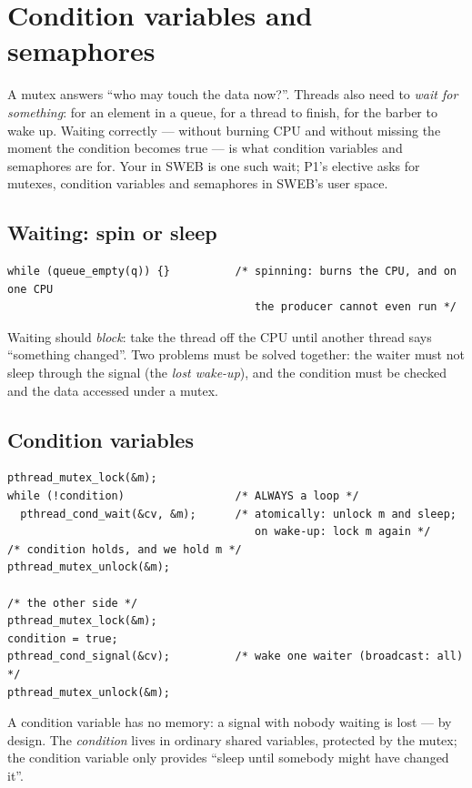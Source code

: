 \chapter{Condition variables and semaphores}
\label{ch:condvars}

A mutex answers ``who may touch the data now?''. Threads also need to
\emph{wait for something}: for an element in a queue, for a thread to
finish, for the barber to wake up. Waiting correctly --- without burning
CPU and without missing the moment the condition becomes true --- is what
condition variables and semaphores are for. Your  in
SWEB is one such wait; P1's elective asks for mutexes, condition variables
and semaphores in SWEB's user space.

\section{Waiting: spin or sleep}

\begin{lstlisting}
while (queue_empty(q)) {}          /* spinning: burns the CPU, and on one CPU
                                      the producer cannot even run */
\end{lstlisting}

Waiting should \emph{block}: take the thread off the CPU until another
thread says ``something changed''. Two problems must be solved together:
the waiter must not sleep through the signal (the \emph{lost wake-up}),
and the condition must be checked and the data accessed under a mutex.

\section{Condition variables}

\begin{lstlisting}
pthread_mutex_lock(&m);
while (!condition)                 /* ALWAYS a loop */
  pthread_cond_wait(&cv, &m);      /* atomically: unlock m and sleep;
                                      on wake-up: lock m again */
/* condition holds, and we hold m */
pthread_mutex_unlock(&m);

/* the other side */
pthread_mutex_lock(&m);
condition = true;
pthread_cond_signal(&cv);          /* wake one waiter (broadcast: all) */
pthread_mutex_unlock(&m);
\end{lstlisting}

A condition variable has no memory: a signal with nobody waiting is lost
--- by design. The \emph{condition} lives in ordinary shared variables,
protected by the mutex; the condition variable only provides ``sleep
until somebody might have changed it''.


